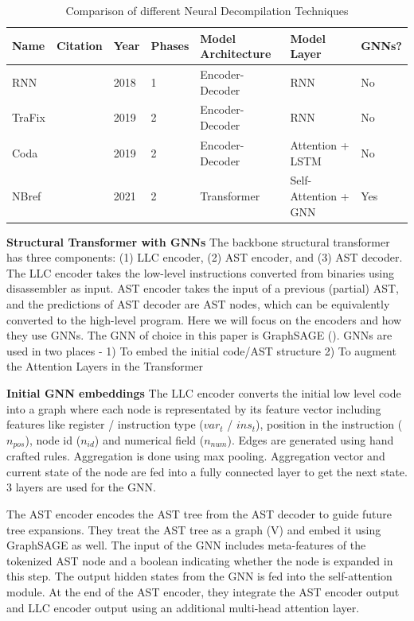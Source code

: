 \documentclass{article}
\begin{document}
\begin{table}[ht]
\caption{Comparison of different Neural Decompilation Techniques}
\label{decompilation_comparison}
\vskip 0.15in
\begin{center}
\begin{tabular}{|l|l|l|l|l|l|l|}
\toprule
Name & Citation & Year & Phases & Model Architecture & Model Layer & GNNs? \\
\midrule
\citet{katz2018using} RNN   & \cite{katz2018using}& 2018 & 1 & Encoder-Decoder & RNN & No\\
TraFix   & \cite{katz2019towards}& 2019 & 2 & Encoder-Decoder & RNN & No\\
Coda  & \cite{coda}& 2019 & 2 & Encoder-Decoder & Attention + LSTM & No\\
NBref  & \cite{nbref}& 2021 & 2 & Transformer & Self-Attention + GNN & Yes\\
\bottomrule
\end{tabular}
\end{center}
\vskip -0.1in
\end{table}

\textbf{Structural Transformer with GNNs}
The backbone structural transformer has three components: (1) LLC encoder, (2) AST encoder, and (3) AST decoder. The LLC encoder takes the low-level instructions converted from binaries using disassembler as input. AST encoder takes the input of a previous (partial) AST, and the predictions of AST decoder are AST nodes, which can be equivalently converted to the high-level program. Here we will focus on the encoders and how they use GNNs. The GNN of choice in this paper is GraphSAGE (\citet{hamilton2017inductive}). GNNs are used in two places - 1) To embed the initial code/AST structure 2) To augment the Attention Layers in the Transformer

\textbf{Initial GNN embeddings}
The LLC encoder converts the initial low level code into a graph where each node is representated by its feature vector including features like register / instruction type ($var_t$
/ $ins_t$), position in the instruction ($n_{pos}$), node id ($n_{id}$) and numerical field ($n_{num}$). Edges are generated using hand crafted rules. Aggregation is done using max pooling. Aggregation vector and current state of the node are fed into a fully connected layer to get the next state. 3 layers are used for the GNN.

The AST encoder encodes the AST tree from the AST decoder to guide future
tree expansions. They treat the AST tree as a graph (V) and embed it using GraphSAGE as well. The input of the GNN includes meta-features of the tokenized AST node and a boolean indicating whether the node is expanded in this step. The output hidden states from the GNN is fed into the self-attention module. At the end of the AST encoder, they integrate the AST encoder output and LLC encoder output using an additional multi-head attention layer.
\end{document}
